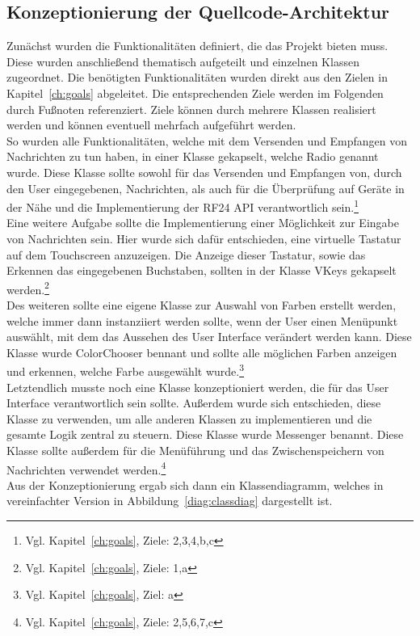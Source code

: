 \documentclass[a4paper, 11pt]{scrartcl}
\begin{document}
\subsection{Konzeptionierung der Quellcode-Architektur}
Zunächst wurden die Funktionalitäten definiert, die das Projekt bieten muss. Diese wurden anschließend thematisch aufgeteilt und einzelnen Klassen zugeordnet.
Die benötigten Funktionalitäten wurden direkt aus den Zielen in Kapitel~\ref{ch:goals} abgeleitet. Die entsprechenden Ziele werden im Folgenden durch Fußnoten
referenziert. Ziele können durch mehrere Klassen realisiert werden und können eventuell mehrfach aufgeführt werden.
\\
So wurden alle Funktionalitäten, welche mit dem Versenden und Empfangen von Nachrichten zu tun haben, in einer Klasse gekapselt, welche \glqq Radio\grqq{} genannt wurde.
Diese Klasse sollte sowohl für das Versenden und Empfangen von, durch den User eingegebenen, Nachrichten, als auch für die Überprüfung auf Geräte in der Nähe und die
Implementierung der RF24 API verantwortlich sein.\footnote{Vgl. Kapitel~\ref{ch:goals}, Ziele: 2,3,4,b,c}
\\
Eine weitere Aufgabe sollte die Implementierung einer Möglichkeit zur Eingabe von Nachrichten sein. Hier wurde sich dafür entschieden, eine virtuelle Tastatur auf dem
Touchscreen anzuzeigen. Die Anzeige dieser Tastatur, sowie das Erkennen das eingegebenen Buchstaben, sollten in der Klasse \glqq VKeys\grqq{} gekapselt 
werden.\footnote{Vgl. Kapitel~\ref{ch:goals}, Ziele: 1,a}
\\
Des weiteren sollte eine eigene Klasse zur Auswahl von Farben erstellt werden, welche immer dann instanziiert werden sollte, wenn der User einen Menüpunkt auswählt,
mit dem das Aussehen des User Interface verändert werden kann. Diese Klasse wurde \glqq ColorChooser\grqq{} bennant und sollte alle möglichen Farben anzeigen 
und erkennen, welche Farbe ausgewählt wurde.\footnote{Vgl. Kapitel~\ref{ch:goals}, Ziel: a}
\\
Letztendlich musste noch eine Klasse konzeptioniert werden, die für das User Interface verantwortlich sein sollte. Außerdem wurde sich entschieden, diese Klasse
zu verwenden, um alle anderen Klassen zu implementieren und die gesamte Logik zentral zu steuern. Diese Klasse wurde \glqq Messenger\grqq{} benannt. Diese Klasse
sollte außerdem für die Menüführung und das Zwischenspeichern von Nachrichten verwendet werden.\footnote{Vgl. Kapitel~\ref{ch:goals}, Ziele: 2,5,6,7,c}
\\
Aus der Konzeptionierung ergab sich dann ein Klassendiagramm, welches in vereinfachter Version in Abbildung~\ref{diag:classdiag} dargestellt ist.
\end{document}
